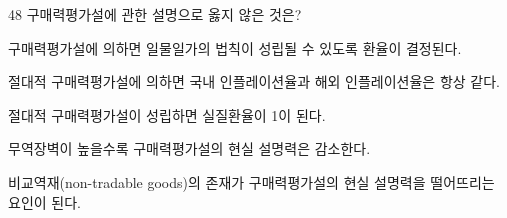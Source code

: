 \begin{question}{48}
구매력평가설에 관한 설명으로 옳지 않은 것은?
\begin{choices}
  \item 구매력평가설에 의하면 일물일가의 법칙이 성립될 수 있도록 환율이 결정된다.
  \item 절대적 구매력평가설에 의하면 국내 인플레이션율과 해외 인플레이션율은 항상 같다.
  \item 절대적 구매력평가설이 성립하면 실질환율이 1이 된다.
  \item 무역장벽이 높을수록 구매력평가설의 현실 설명력은 감소한다.
  \item 비교역재(non-tradable goods)의 존재가 구매력평가설의 현실 설명력을 떨어뜨리는 요인이 된다.
\end{choices}
\end{question}
